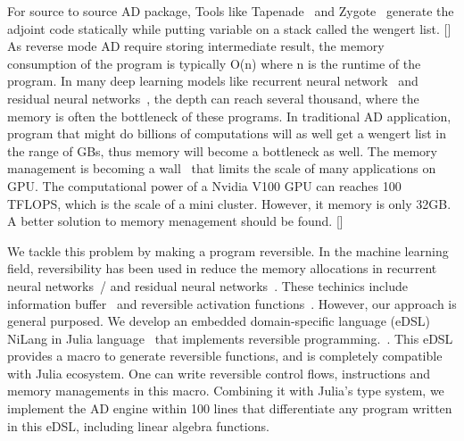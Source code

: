 \documentclass[aps,twocolumn,longbibliography,english,superscriptaddress]{revtex4-1}
\newcommand{\<}{\langle}
\renewcommand{\>}{\rangle}
\newcommand{\blue}[1]{[{\bf  \color{blue}{JG: #1}}]}
\theoremstyle{definition}\newtheorem{definition}{\textit{Definition}}
\begin{document}
    For source to source AD package, Tools like Tapenade~\cite{Hascoet2013} and Zygote~\cite{Innes2018, Innes2019} generate the adjoint code statically while putting variable on a stack called the wengert list. \blue{The introduction to source to source AD is a bit weak, please give reader an overview about the development and difficulty in this field.}
    As reverse mode AD require storing intermediate result, the memory consumption of the program is typically O(n) where n is the runtime of the program. In many deep learning models like recurrent neural network~\cite{Lipton2015} and residual neural networks~\cite{He2016}, the depth can reach several thousand, where the memory is often the bottleneck of these programs. In traditional AD application, program that might do billions of computations will as well get a wengert list in the range of GBs, thus memory will become a bottleneck as well.
The memory management is becoming a wall~\cite{Luo2019} that limits the scale of many applications on GPU. The computational power of a Nvidia V100 GPU can reaches 100 TFLOPS, which is the scale of a mini cluster. However, it memory is only 32GB. A better solution to memory menagement should be found.
    \blue{@MLS, Do you have any good comments about starving CPU, i.e. memory accessing is consuming much more time than computing itself.
    This is why caching itermediate result is a performance killer.}



    We tackle this problem by making a program reversible. In the machine learning field, reversibility has been used in reduce the memory allocations in recurrent neural networks~/\cite{MacKay2018} and residual neural networks~\cite{Behrmann2018}. These techinics include information buffer~\cite{Maclaurin2015} and reversible activation functions~\cite{Gomez2017,Jacobsen2018}. However, our approach is general purposed. We develop an embedded domain-specific language (eDSL) NiLang in Julia language~\cite{Bezanson2012,Bezanson2017} that implements reversible programming.~\cite{Perumalla2013,Frank2017}.
    This eDSL provides a macro to generate reversible functions, and is completely compatible with Julia ecosystem. One can write reversible control flows, instructions and memory managements in this macro. Combining it with Julia's type system, we implement the AD engine within 100 lines that differentiate any program written in this eDSL, including linear algebra functions.
\end{document}
